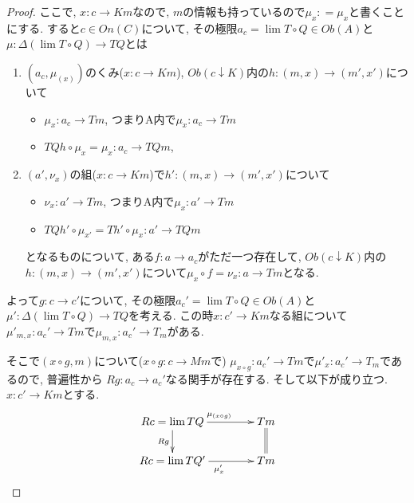 \documentclass[dvipdfmx,a4paper,11pt]{article}
\theoremstyle{definition}
\begin{document}
\begin{proof}
ここで, $x : c \to Km$なので, $m$の情報も持っているので$\mu_{x} : = \mu_x$と書くことにする. 
すると$c \in On(C)$について, その極限$a_c =\lim T\circ Q \in Ob(A)$と$\mu: \Delta (\lim T\circ Q) \to TQ$とは
\begin{enumerate}
\item $(a_c , \mu_{(x)})$のくみ($x : c \to Km $), $Ob(c \downarrow K )$内の$h : (m,x)\to (m',x')$について
\begin{itemize}
\item $\mu_{x} : a_c \to Tm  $, つまりA内で$\mu_{x} :  a_c  \to Tm $
\item $ TQ h  \circ \mu_{x} = \mu_{x} :a_c \to  TQm $, 
\end{itemize}
\item $(a' , \nu_{x})$の組($x : c \to Km $)で$h' : (m,x)\to (m',x')$について
\begin{itemize}
\item $\nu_{x} : a' \to Tm $, つまりA内で$\mu_{x} : a' \to Tm $
\item $  TQ h' \circ \mu_{x'}=Th' \circ \mu_{x}  :a '  \to  TQm$
\end{itemize}
となるものについて, ある$f : a \to a_c$がただ一つ存在して,  $Ob(c \downarrow K )$内の$h : (m,x)\to (m',x')$について$\mu_{x} \circ f = \nu_{x}: a \to Tm$となる.
\end{enumerate}

よって$g : c \to c'$について, 
 その極限$a_c' =\lim T\circ Q \in Ob(A)$と$\mu': \Delta (\lim T\circ Q) \to TQ$を考える.
 この時$x : c' \to Km $なる組について$\mu'_{m,x} : a_c' \to Tm$で$\mu_{m,x} : a_c' \to T_m $がある.
 
 そこで$(x \circ g , m)$について($x \circ g : c \to Mm$で)
 $\mu_{x\circ g} : a_c' \to Tm$で$\mu'_{x} : a_c' \to T_m $であるので, 
 普遍性から
 $Rg : a_c \to a_c'$なる関手が存在する. 
 そして以下が成り立つ. $x : c'\to Km$とする. 
\begin{equation*}
\xymatrix@C=40pt@R=20pt{
Rc = \lim TQ  \ar@{->}[d]_{Rg}  \ar@{->}[r]^{\mu_{(x\circ g)}} & Tm\ar@{=}[d] \\
Rc = \lim TQ' \ar@{->}[r]_{\mu'_{x}} &Tm \\   
}
\end{equation*}


\end{proof}
\end{document}

